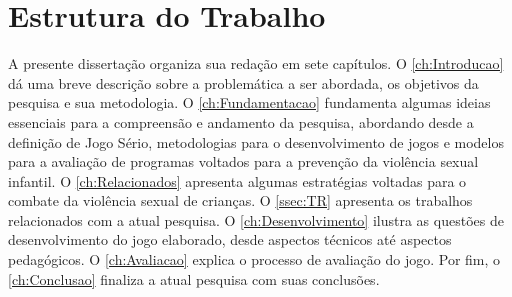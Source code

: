 

\section{Estrutura do Trabalho}\label{ch:Estrutura}

A presente dissertação organiza sua redação em sete capítulos. O \autoref{ch:Introducao} dá uma breve descrição sobre a problemática a ser abordada, os objetivos da pesquisa e sua metodologia. O \autoref{ch:Fundamentacao} fundamenta algumas ideias essenciais para a compreensão e andamento da pesquisa, abordando desde a definição de Jogo Sério, metodologias para o desenvolvimento de jogos e modelos para a avaliação de programas voltados para a prevenção da violência sexual infantil. O \autoref{ch:Relacionados} apresenta algumas estratégias voltadas para o combate da violência sexual de crianças. O \autoref{ssec:TR} apresenta os trabalhos relacionados com a atual pesquisa. O \autoref{ch:Desenvolvimento} ilustra as questões de desenvolvimento do jogo elaborado, desde aspectos técnicos até aspectos pedagógicos. O \autoref{ch:Avaliacao} explica o processo de avaliação do jogo. Por fim, o \autoref{ch:Conclusao} finaliza a atual pesquisa com suas conclusões.






